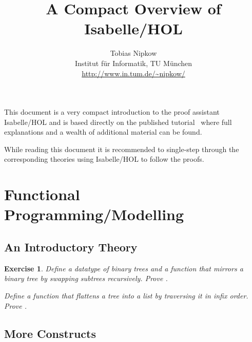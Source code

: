\documentclass[11pt,a4paper]{article}
\newtheorem{Exercise}{Exercise}[section]
\newenvironment{exercise}{\begin{Exercise}\rm}{\end{Exercise}}
\begin{document}
\title{A Compact Overview of Isabelle/HOL}
\author{Tobias Nipkow\\Institut f{\"u}r Informatik, TU M{\"u}nchen\\
 \small\url{http://www.in.tum.de/~nipkow/}}
\date{}
\maketitle

\noindent
This document is a very compact introduction to the proof assistant
Isabelle/HOL and is based directly on the published tutorial~\cite{LNCS2283}
where full explanations and a wealth of additional material can be found.

While reading this document it is recommended to single-step through the
corresponding theories using Isabelle/HOL to follow the proofs.

\section{Functional Programming/Modelling}

\subsection{An Introductory Theory}


\begin{exercise}
Define a datatype of binary trees and a function 
that mirrors a binary tree by swapping subtrees recursively. Prove
.

Define a function  that flattens a tree into a list
by traversing it in infix order. Prove
.
\end{exercise}

\subsection{More Constructs}










%





\end{document}
